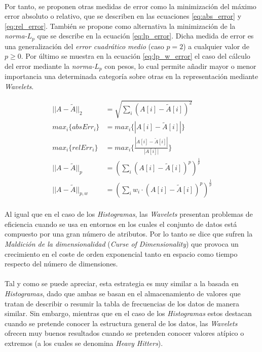 \documentclass{subfiles}
\begin{document}
        \paragraph{}
        Por tanto, se proponen otras medidas de error como la minimización del máximo error absoluto o relativo, que se describen en las ecuaciones \eqref{eq:abs_error} y \eqref{eq:rel_error}. También se propone como alternativa la minimización de la \emph{norma-$L_p$} que se describe en la ecuación \eqref{eq:lp_error}. Dicha medida de error es una generalización del \emph{error cuadrático medio} (caso $p=2$) a cualquier valor de $p \geq 0$. Por último se muestra en la ecuación \eqref{eq:lp_w_error} el caso del cálculo del error mediante la \emph{norma-$L_p$} con pesos, lo cual permite añadir mayor o menor importancia una determinada categoría sobre otras en la representación mediante \emph{Wavelets}.

        \begin{align}
        \label{eq:l2_error}
          ||A - \widetilde{A} ||_2  &= \sqrt{\sum_{i}(A[i]-\widetilde{A}[i])^2} \\
        \label{eq:abs_error}
          max_i\{absErr_i\} &= max_i\{|A[i]-\widetilde{A}[i]|\} \\
        \label{eq:rel_error}
          max_i\{relErr_i\} &= max_i\bigg\{\frac{|A[i]-\widetilde{A}[i]|}{|A[i]|} \bigg\} \\
        \label{eq:lp_error}
          ||A - \widetilde{A} ||_{p}  &= (\sum_{i}(A[i]-\widetilde{A}[i])^p)^{\frac{1}{p}} \\
        \label{eq:lp_w_error}
          ||A - \widetilde{A} ||_{p,w}  &= (\sum_{i}w_i \cdot(A[i]-\widetilde{A}[i])^p)^{\frac{1}{p}}
        \end{align}

        \paragraph{}
        Al igual que en el caso de los \emph{Histogramas}, las \emph{Wavelets} presentan problemas de eficiencia cuando se usa en entornos en los cuales el conjunto de datos está compuesto por una gran número de atributos. Por lo tanto se dice que sufren la \emph{Maldición de la dimensionalidad} (\emph{Curse of Dimensionality}) que provoca un crecimiento en el coste de orden exponencial tanto en espacio como tiempo respecto del número de dimensiones.

        \paragraph{}
        Tal y como se puede apreciar, esta estrategia es muy similar a la basada en \emph{Histogramas}, dado que ambas se basan en el almacenamiento de valores que tratan de describir o resumir la tabla de frecuencias de los datos de manera similar. Sin embargo, mientras que en el caso de los \emph{Histogramas} estos destacan cuando se pretende conocer la estructura general de los datos, las \emph{Wavelets} ofrecen muy buenos resultados cuando se pretenden conocer valores atípico o extremos (a los cuales se denomina \emph{Heavy Hitters}).
\end{document}
